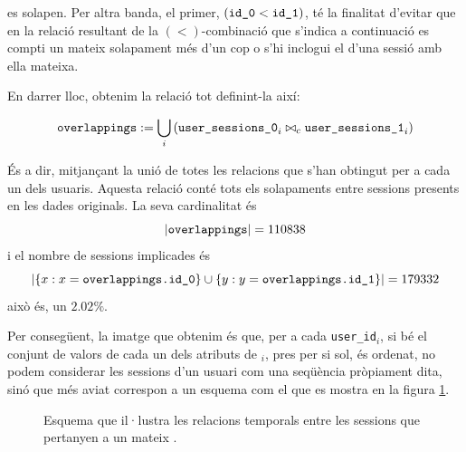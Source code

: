 \documentclass[
	a4paper,
	twoside,
	justified
]{tufte-book}
\begin{document}
es solapen. Per altra banda, el primer, $(\texttt{id\_0} < \texttt{id\_1})$, té la finalitat d'evitar que en la relació resultant de la $(<)$-combinació que s'indica a continuació es compti un mateix solapament més d'un cop o s'hi inclogui el d'una sessió amb ella mateixa.  
 
En darrer lloc, obtenim la relació  tot definint-la així:

\begin{align*}
\texttt{overlappings} := \bigcup_{i} \left( \texttt{user\_sessions\_0}_i \bowtie_{c} \texttt{user\_sessions\_1}_i \right) 
\end{align*}

És a dir, mitjançant la unió de totes les relacions que s'han obtingut per a cada un dels usuaris. Aquesta relació conté tots els solapaments entre sessions presents en les dades originals. La seva cardinalitat és 
$$
	|\texttt{overlappings}| = 110838
$$ 
i el nombre de sessions implicades és 
$$
|\{x:x=\texttt{overlappings.id\_0}\} \cup \{y: y=\texttt{overlappings.id\_1}\}| = 179332
$$
això és, un $2.02\%$.

Per consegüent, la imatge que obtenim és que, per a cada \texttt{user\_id}$_i$, si bé el conjunt de valors de cada un dels atributs de $_i$, pres per si sol, és ordenat, no podem considerar les sessions d'un usuari com una seqüència pròpiament dita, sinó que més aviat correspon a un esquema com el que es mostra en la figura \ref{dia:user_sessions}.  

\begin{figure}
\begin{center}
\end{center}
\caption{
 \label{dia:user_sessions}
 Esquema que il·lustra les relacions temporals entre les sessions que pertanyen a un mateix .
}
\end{figure}
\end{document}

